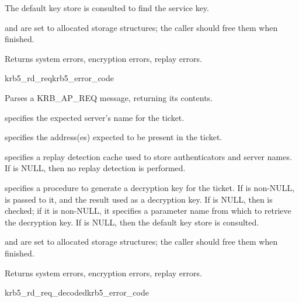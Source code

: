 The default key store is consulted to find the service key.

 and
 are set to allocated storage
structures; the caller should free them when finished.

Returns system errors, encryption errors, replay errors.


\begin{funcdecl}{krb5_rd_req}{krb5_error_code}{\funcin}
\funcendfuncarg
{}
\funcinout
{}
\funcout
{}
\end{funcdecl}


Parses a KRB_AP_REQ message, returning its contents.

 specifies the expected server's name for the ticket.

 specifies the address(es) expected to be present
in the ticket.

 specifies a replay detection cache used to store
authenticators and server names.  If  is NULL, then no
replay detection is performed.

 specifies a procedure to generate a decryption key for the
ticket.  If  is non-NULL,  is
passed to it, and the result used as a decryption key. If
 is NULL, then  is checked; if
it is non-NULL, it specifies a parameter name from which to retrieve the
decryption key.  If  is NULL, then the default key
store is consulted.

 and
 are set to allocated storage
structures; the caller should free them when finished.

Returns system errors, encryption errors, replay errors.

\begin{funcdecl}{krb5_rd_req_decoded}{krb5_error_code}{\funcin}
\funcendfuncarg
{}
\funcout
{}
\end{funcdecl}

